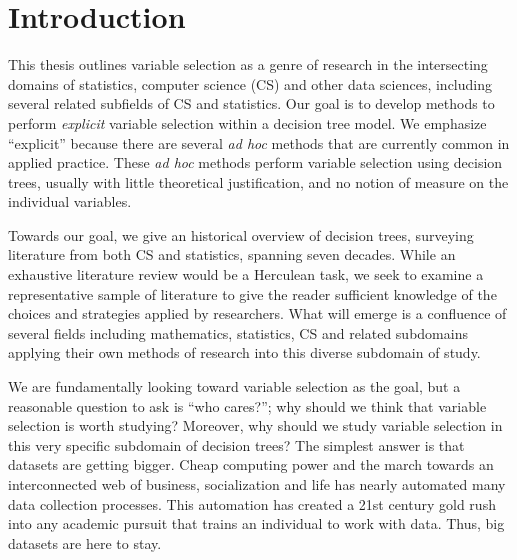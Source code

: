 \section{Introduction}
\label{ch:intro}






This thesis outlines variable selection as a genre of research in the intersecting domains of statistics, computer science (CS) and other data sciences, including several related subfields of CS  and statistics. Our goal is to develop methods to perform \emph{explicit} variable selection within a decision tree model. We emphasize ``explicit'' because there are several \emph{ad hoc} methods that are currently common in applied practice. These \emph{ad hoc} methods perform variable selection using decision trees, usually with little theoretical justification, and no notion of measure on the individual variables. 

Towards our goal, we give an historical overview of decision trees, surveying literature from both CS and statistics, spanning seven decades. While an exhaustive literature review would be a Herculean task, we seek to examine a representative sample of literature to give the reader sufficient knowledge of the choices and strategies applied by researchers. 
What will emerge is a confluence of several fields including mathematics, statistics, CS and related subdomains applying their own methods of research into this diverse subdomain of study.     


We are fundamentally looking toward variable selection as the goal, but a reasonable question to ask is ``who cares?''; why should we think that variable selection is worth studying? Moreover, why should we study variable selection in this very specific subdomain of decision trees? The simplest answer is that datasets are getting bigger. Cheap computing power and the march towards an interconnected web of business, socialization and life has nearly automated many data collection processes. This automation has created a 21st century gold rush into any academic pursuit that trains an individual to work with data. %
Thus, big datasets are here to stay.

